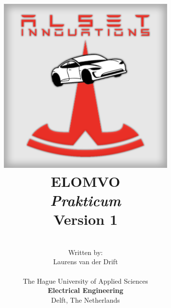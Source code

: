 \title{
\includegraphics[width=3.5in]{img/Logo.png} \\
\vspace*{1in}
\textbf{ELOMVO}\\
\textit{Prakticum}\\
Version 1
}
\author{
\vspace*{0.5in} \\
  Written by:\\
  Laurens van der Drift\\
\vspace*{0.2in} \\
    The Hague University of Applied Sciences\\
    \textbf{Electrical Engineering}\\
    Delft, The Netherlands
   } 